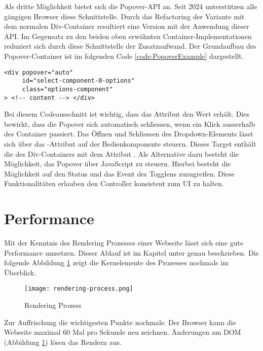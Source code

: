 Als dritte Möglichkeit bietet sich die Popover-API an. 
Seit 2024 unterstützen alle gängigen Browser diese Schnittstelle.
Durch das Refactoring der Variante mit dem normalen Div-Container resultiert eine Version mit der Anwendung dieser API. 
Im Gegensatz zu den beiden oben erwähnten Container-Implementationen reduziert sich durch diese Schnittstelle der Zusatzaufwand. 
Der Grundaufbau des Popover-Container ist im folgenden Code \ref{code:PopoverExample} dargestellt. 

\begin{lstlisting}[style = htmlcssjs, caption = Popover-Container Beispiel, label = code:PopoverExample]
<div popover="auto"
     id="select-component-0-options" 
     class="options-component" 
> <!-- content --> </div>
\end{lstlisting}

Bei diesem Codeausschnitt ist wichtig, dass das Attribut  den Wert  erhält.
Dies bewirkt, dass die Popover sich automatisch schliessen, wenn ein Klick ausserhalb des Container passiert.
Das Öffnen und Schliessen des Dropdown-Elements lässt sich über das -Attribut auf der Bedienkomponente steuern.
Dieses Target enthält die  des Div-Containers mit dem Attribut . 
Als Alternative dazu besteht die Möglichkeit, das Popover über JavaScript zu steuern.
Hierbei besteht die Möglichkeit auf den Status und das Event des Togglens zuzugreifen.
Diese Funktionalitäten erlauben den Controller konsistent zum UI zu halten.


\section{Performance}
\label{sec:performance}

Mit der Kenntnis des Rendering Prozesses einer Webseite lässt sich eine gute Performance umsetzen. 
Dieser Ablauf ist im Kapitel \textbf{} unter \textbf{} genau beschrieben.
Die folgende Abbildung \ref{img:RenderingProcessRecap} zeigt die Kernelemente des Prozesses nochmals im Überblick.

\begin{figure}[!htb]
    \centering
    \texttt{[image: rendering-process.png]}
    \caption{Rendering Prozess}
    \label{img:RenderingProcessRecap}
\end{figure}

Zur Auffrischung die wichtigesten Punkte nochmals: 
Der Browser kann die Webseite maximal 60 Mal pro Sekunde neu zeichnen.
Änderungen am DOM (Abbildung \ref{img:RenderingProcessRecap}) lösen das Rendern aus. 

